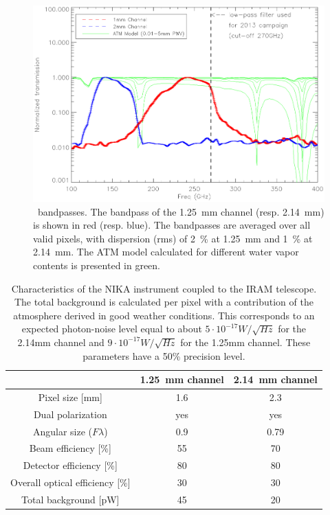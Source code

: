 \begin{figure}[t]
\begin{center}
\includegraphics[scale=0.52]{figures/pass_band_ATM.ps}
\end{center}
\caption{\NIKA\ bandpasses.  The bandpass of the 1.25~mm channel (resp. 2.14~mm)
  is shown in red (resp. blue). The bandpasses are averaged over all valid
  pixels, with dispersion (rms) of 2~\% at 1.25~mm and 1~\% at 2.14~mm.  The ATM
  model calculated for different water vapor contents is presented in green.}
\label{fig:bandpass}
   \end{figure}


\begin{table}
\begin{center}
\begin{tabular}{ccc}
\hline
\hline
 & 1.25~mm channel &  2.14~mm channel  \\
\hline \hline
Pixel size [mm] & 1.6   & 2.3 \\
Dual polarization &  yes & yes \\
Angular size ($F \lambda$) &  0.9 & 0.79 \\
Beam efficiency [\%] &  55 & 70 \\
Detector efficiency [\%] & 80 & 80 \\
Overall optical efficiency [\%] &  30 & 30  \\
Total background [pW] &  45 & 20  \\
\hline \hline
\end{tabular}
\end{center}
\caption{Characteristics of the NIKA instrument coupled to the IRAM telescope. The total background is calculated per pixel with a contribution of the atmosphere derived in good weather conditions. This corresponds to an expected photon-noise level equal to about $5 \cdot 10^{-17} W/\sqrt{Hz}$ for the 2.14mm channel and $9 \cdot 10^{-17} W/\sqrt{Hz}$ for the 1.25mm channel. These parameters have a 50\% precision level.}
\label{tab:nika_char}
\end{table}

